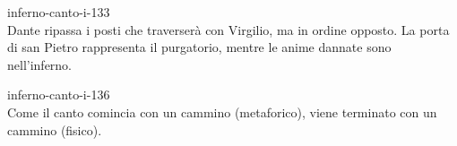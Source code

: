 \documentclass[preview]{standalone}
\begin{document}
\begin{snippet}{inferno-canto-i-133}
    \\
    Dante ripassa i posti che traverserà con Virgilio, ma in ordine opposto.
    La porta di san Pietro rappresenta il purgatorio, mentre le anime dannate
    sono nell'inferno.
\end{snippet}

\begin{snippet}{inferno-canto-i-136}
    \\
    Come il canto comincia con un cammino (metaforico), viene terminato
    con un cammino (fisico).
\end{snippet}
\end{document}
